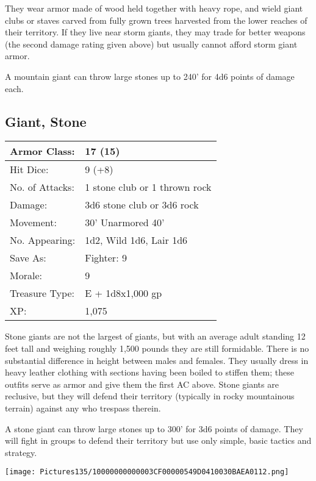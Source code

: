 \documentclass[a4paper,twoside,openany,10pt]{book}
\begin{document}
\begin{multicols}{2}
They wear armor made of wood held together with heavy rope, and wield giant clubs or staves carved from fully grown trees harvested from the lower reaches of their territory. If they live near storm giants, they may trade for better weapons (the second damage rating given above) but usually cannot afford storm giant armor.

A mountain giant can throw large stones up to 240' for 4d6 points of damage each.

\columnbreak

\subsection*{Giant, Stone}\label{giant-stone}

\begin{tabularx}{0.48\textwidth}{@{}lX@{}}
Armor Class: & 17 (15) \\\hline
Hit Dice: & 9 (+8) \\\hline
No. of Attacks: & 1 stone club or 1 thrown rock \\\hline
Damage: & 3d6 stone club or 3d6 rock \\\hline
Movement: & 30' Unarmored 40' \\\hline
No. Appearing: & 1d2, Wild 1d6, Lair 1d6 \\\hline
Save As: & Fighter: 9 \\\hline
Morale: & 9 \\\hline
Treasure Type: & E + 1d8x1,000 gp \\\hline
XP: & 1,075 \\\hline
\end{tabularx}\medskip

Stone giants are not the largest of giants, but with an average adult standing 12 feet tall and weighing roughly 1,500 pounds they are still formidable. There is no substantial difference in height between males and females. They usually dress in heavy leather clothing with sections having been boiled to stiffen them; these outfits serve as armor and give them the first AC above. Stone giants are reclusive, but they will defend their territory (typically in rocky mountainous terrain) against any who trespass therein.

A stone giant can throw large stones up to 300' for 3d6 points of damage. They will fight in groups to defend their territory but use only simple, basic tactics and strategy. 

\begin{center}
	\texttt{[image: Pictures135/10000000000003CF00000549D0410030BAEA0112.png]}
\end{center}


\end{multicols}
\end{document}
